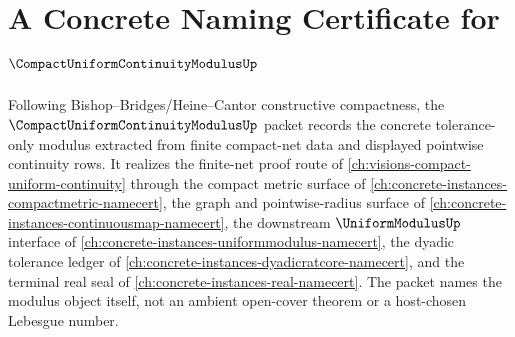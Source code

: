 \chapter{A Concrete Naming Certificate for $\CompactUniformContinuityModulusUp$}
\label{ch:concrete-instances-compact-uniform-continuity-modulus-namecert}

Following Bishop--Bridges/Heine--Cantor constructive compactness, the $\CompactUniformContinuityModulusUp$ packet records the concrete tolerance-only modulus extracted from finite compact-net data and displayed pointwise continuity rows. It realizes the finite-net proof route of \autoref{ch:visions-compact-uniform-continuity} through the compact metric surface of \autoref{ch:concrete-instances-compactmetric-namecert}, the graph and pointwise-radius surface of \autoref{ch:concrete-instances-continuousmap-namecert}, the downstream $\UniformModulusUp$ interface of \autoref{ch:concrete-instances-uniformmodulus-namecert}, the dyadic tolerance ledger of \autoref{ch:concrete-instances-dyadicratcore-namecert}, and the terminal real seal of \autoref{ch:concrete-instances-real-namecert}. The packet names the modulus object itself, not an ambient open-cover theorem or a host-chosen Lebesgue number.

